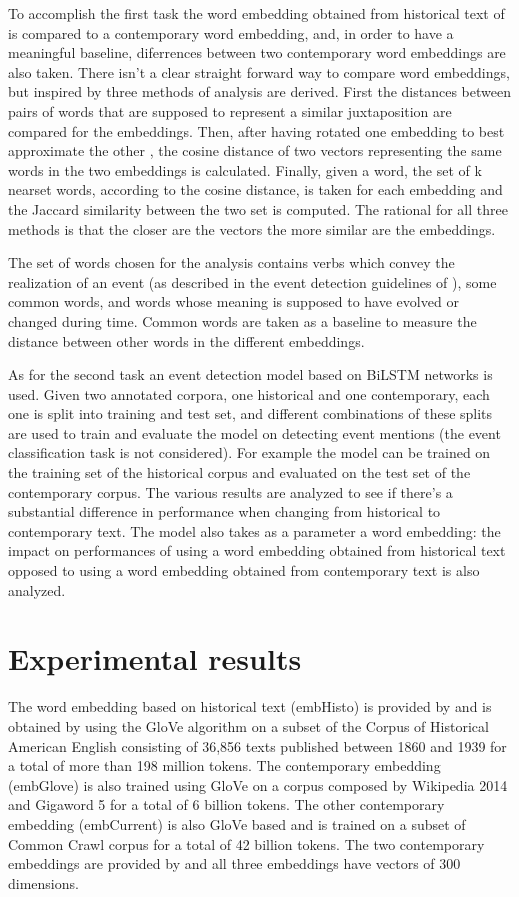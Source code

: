 \documentclass[runningheads]{llncs}
\begin{document}
To accomplish the first task the word embedding obtained from historical text of \cite{histo} is compared to a contemporary word embedding, and, in order to have a meaningful baseline, diferrences between two contemporary word embeddings are also taken. There isn't a clear straight forward way to compare word embeddings, but inspired by \cite{embcomp} three methods of analysis are derived. First the distances between pairs of words that are supposed to represent a similar juxtaposition are compared for the embeddings. Then, after having rotated one embedding to best approximate the other \cite{rotation}, the cosine distance of two vectors representing the same words in the two embeddings is calculated. Finally, given a word, the set of k nearset words, according to the cosine distance, is taken for each embedding and the Jaccard similarity between the two set is computed. The rational for all three methods is that the closer are the vectors the more similar are the embeddings.

The set of words chosen for the analysis contains verbs which convey the realization of an event (as described in the event detection guidelines of \cite{histo}), some common words, and words whose meaning is supposed to have evolved or changed during time. Common words are taken as a baseline to measure the distance between other words in the different embeddings.

As for the second task an event detection model based on BiLSTM networks \cite{bilstm} is used. Given two annotated corpora, one historical and one contemporary, each one is split into training and test set, and different combinations of these splits are used to train and evaluate the model on detecting event mentions (the event classification task is not considered). For example the model can be trained on the training set of the historical corpus and evaluated on the test set of the contemporary corpus. The various results are analyzed to see if there's a substantial difference in performance when changing from historical to contemporary text. The model also takes as a parameter a word embedding: the impact on performances of using a word embedding obtained from historical text opposed to using a word embedding obtained from contemporary text is also analyzed.

\section{Experimental results}

The word embedding based on historical text (embHisto) is provided by \cite{histo} and is obtained by using the GloVe algorithm on a subset of the Corpus of Historical American English consisting of 36,856 texts published between 1860 and 1939 for a total of more than 198 million tokens. The contemporary embedding (embGlove) is also trained using GloVe on a corpus composed by Wikipedia 2014 and Gigaword 5 for a total of 6 billion tokens. The other contemporary embedding (embCurrent) is also GloVe based and is trained on a subset of Common Crawl corpus for a total of 42 billion tokens. The two contemporary embeddings are provided by \cite{glove} and all three embeddings have vectors of 300 dimensions.
\end{document}
